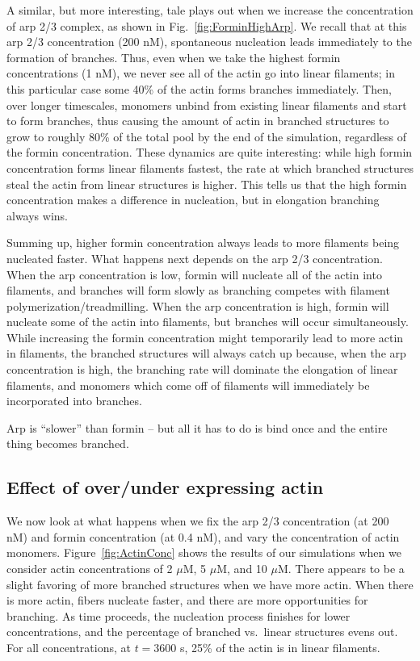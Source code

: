 \documentclass[11pt]{article}
\newcommand{\red}[1]{\color{red}#1\normalcolor}
\begin{document}
A similar, but more interesting, tale plays out when we increase the concentration of arp 2/3 complex, as shown in Fig.\ \ref{fig:ForminHighArp}. We recall that at this arp 2/3 concentration (200 nM), spontaneous nucleation leads immediately to the formation of branches. Thus, even when we take the highest formin concentrations (1 nM), we never see all of the actin go into linear filaments; in this particular case some 40\% of the actin forms branches immediately. Then, over longer timescales, monomers unbind from existing linear filaments and start to form branches, thus causing the amount of actin in branched structures to grow to roughly 80\% of the total pool by the end of the simulation, regardless of the formin concentration. These dynamics are quite interesting: while high formin concentration forms linear filaments fastest, the rate at which branched structures steal the actin from linear structures is higher. This tells us that the high formin concentration makes a difference in nucleation, but in elongation branching always wins. 

Summing up, higher formin concentration always leads to more filaments being nucleated faster. What happens next depends on the arp 2/3 concentration. When the arp concentration is low, formin will nucleate all of the actin into filaments, and branches will form slowly as branching competes with filament polymerization/treadmilling. When the arp concentration is high, formin will nucleate some of the actin into filaments, but branches will occur simultaneously. While increasing the formin concentration might temporarily lead to more actin in filaments, the branched structures will always catch up because, when the arp concentration is high, the branching rate will dominate the elongation of linear filaments, and monomers which come off of filaments will immediately be incorporated into branches. 

\red{Arp is ``slower'' than formin -- but all it has to do is bind once and the entire thing becomes branched.}

\subsection{Effect of over/under expressing actin}
We now look at what happens when we fix the arp 2/3 concentration (at 200 nM) and formin concentration (at 0.4 nM), and vary the concentration of actin monomers. Figure\ \ref{fig:ActinConc} shows the results of our simulations when we consider actin concentrations of 2 $\mu$M, 5 $\mu$M, and 10 $\mu$M. There appears to be a slight favoring of more branched structures when we have more actin. When there is more actin, fibers nucleate faster, and there are more opportunities for branching. As time proceeds, the nucleation process finishes for lower concentrations, and the percentage of branched vs.\  linear structures evens out. For all concentrations, at $t=3600$ s, 25\% of the actin is in linear filaments. 
\end{document}
